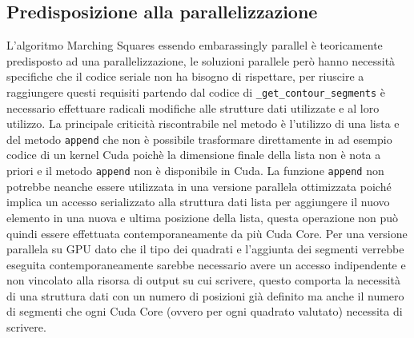 \documentclass[12pt,a4paper]{report}
\begin{document}
\subsection{Predisposizione alla parallelizzazione}
L'algoritmo Marching Squares essendo embarassingly parallel è teoricamente predisposto ad una parallelizzazione, le soluzioni parallele però hanno necessità specifiche che il codice seriale non ha bisogno di rispettare,  per riuscire a raggiungere questi requisiti partendo dal codice di  \verb|_get_contour_segments| è necessario effettuare radicali modifiche alle strutture dati utilizzate e al loro utilizzo. \newline
La principale criticità riscontrabile nel metodo è l'utilizzo di una lista e del metodo \verb|append| che non è possibile trasformare direttamente in ad esempio codice di un kernel Cuda poichè la dimensione finale della lista non è nota a priori e il metodo  \verb|append| non è disponibile in Cuda.  La funzione \verb|append| non potrebbe neanche essere utilizzata in una versione parallela ottimizzata poiché implica un accesso serializzato alla struttura dati lista per aggiungere il nuovo elemento in una nuova e ultima posizione della lista, questa operazione non può quindi essere effettuata contemporaneamente da più Cuda Core.  Per una versione parallela su GPU dato che il tipo dei quadrati e l'aggiunta dei segmenti verrebbe eseguita contemporaneamente sarebbe necessario avere un accesso indipendente e non vincolato alla risorsa di output su cui scrivere,  questo comporta la necessità di una struttura dati con un numero di posizioni già definito ma anche il numero di segmenti che ogni Cuda Core (ovvero per ogni quadrato valutato) necessita di scrivere.

\end{document}
